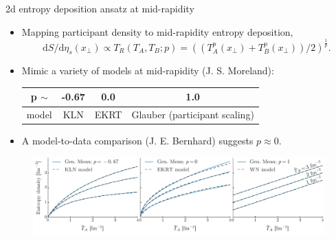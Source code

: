 \documentclass[11pt]{beamer}
\begin{document}
\begin{frame}{2d entropy deposition ansatz at mid-rapidity}
\begin{itemize}
\item Mapping participant density to mid-rapidity entropy deposition,
	\begin{equation}
		\mathrm{d}S/\mathrm{d}\eta_s(x_\perp) \propto T_R(T_A, T_B; p) = \left(\left(T_A^p(x_\perp) + T_B^p(x_\perp)\right)/2\right)^{\frac{1}{p}}.
	\end{equation}
\item Mimic a variety of models at mid-rapidity (J. S. Moreland):
\begin{center}
\begin{tabular}{cccc}
\hline 
p $\sim$ & -0.67 & 0.0  & 1.0 \\ 
\hline 
model  & KLN   & EKRT & Glauber (participant scaling) \\ 
\hline 
\end{tabular} 
\end{center}
\item A model-to-data comparison (J. E. Bernhard) suggests $p \approx 0$.
\end{itemize}
\begin{center}
\begin{figure}
\includegraphics[width=\textwidth]{./pics/cgc_compare.pdf}
\end{figure}
\end{center}
\end{frame}
\end{document}

